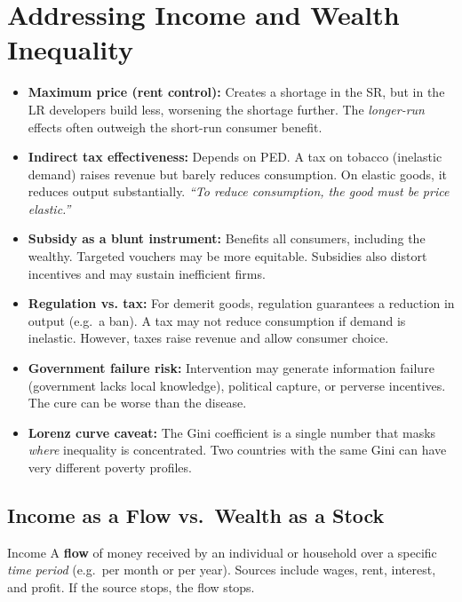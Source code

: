 \documentclass[11pt, a4paper, twoside]{book}
\begin{document}
\section{Addressing Income and Wealth Inequality}
\begin{tcolorbox}[enhanced,colback=EvalBg,colframe=EvalFrame,arc=0pt,boxrule=1pt,title={\bfseries\color{EvalFrame}Evaluation: Government Microeconomic Intervention},fonttitle=\small]
\small\RaggedRight
\begin{itemize}[itemsep=2pt,topsep=2pt]
  \item \textbf{Maximum price (rent control):} Creates a shortage in the SR, but in the LR developers build less, worsening the shortage further. The \textit{longer-run} effects often outweigh the short-run consumer benefit.
  \item \textbf{Indirect tax effectiveness:} Depends on PED. A tax on tobacco (inelastic demand) raises revenue but barely reduces consumption. On elastic goods, it reduces output substantially. \textit{``To reduce consumption, the good must be price elastic.''}
  \item \textbf{Subsidy as a blunt instrument:} Benefits all consumers, including the wealthy. Targeted vouchers may be more equitable. Subsidies also distort incentives and may sustain inefficient firms.
  \item \textbf{Regulation vs. tax:} For demerit goods, regulation guarantees a reduction in output (e.g.\ a ban). A tax may not reduce consumption if demand is inelastic. However, taxes raise revenue and allow consumer choice.
  \item \textbf{Government failure risk:} Intervention may generate information failure (government lacks local knowledge), political capture, or perverse incentives. The cure can be worse than the disease.
  \item \textbf{Lorenz curve caveat:} The Gini coefficient is a single number that masks \textit{where} inequality is concentrated. Two countries with the same Gini can have very different poverty profiles.
\end{itemize}
\end{tcolorbox}


\subsection{Income as a Flow vs.\ Wealth as a Stock}

\begin{keyterm}{Income}
A \textbf{flow} of money received by an individual or household over a specific \emph{time period} (e.g.\ per month or per year). Sources include wages, rent, interest, and profit. If the source stops, the flow stops.
\end{keyterm}
\end{document}
